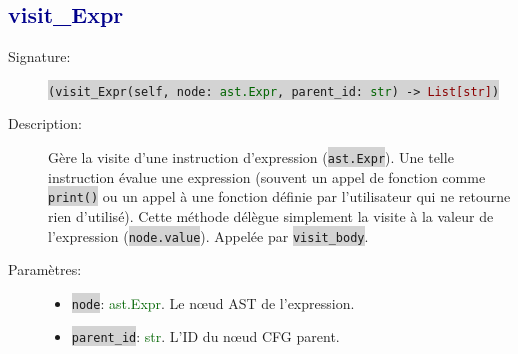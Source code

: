 \documentclass[11pt,a4paper]{article}
\newcommand{\code}[1]{\colorbox{lightgray}{\texttt{\small #1}}}
\newcommand{\vartype}[1]{\textcolor{darkgreen}{#1}}
\newcommand{\methodname}[1]{\textbf{\textcolor{darkblue}{#1}}}
\newcommand{\param}[1]{\code{#1}}
\newcommand{\rettype}[1]{\textcolor{darkred}{#1}}
\begin{document}
\subsection*{\methodname{visit\_Expr}}
\begin{description}
    \item[Signature:] \code{(visit\_Expr(self, node: \vartype{ast.Expr}, parent\_id: \vartype{str}) -> \rettype{List[str]})}
    \item[Description:] Gère la visite d'une instruction d'expression (\code{ast.Expr}). Une telle instruction évalue une expression (souvent un appel de fonction comme \code{print()} ou un appel à une fonction définie par l'utilisateur qui ne retourne rien d'utilisé). Cette méthode délègue simplement la visite à la valeur de l'expression (\code{node.value}). Appelée par \code{visit\_body}.
    \item[Paramètres:]
    \begin{itemize}
        \item \param{node}: \vartype{ast.Expr}. Le nœud AST de l'expression.
        \item \param{parent\_id}: \vartype{str}. L'ID du nœud CFG parent.
    \end{itemize}
\end{description}
\end{document}
